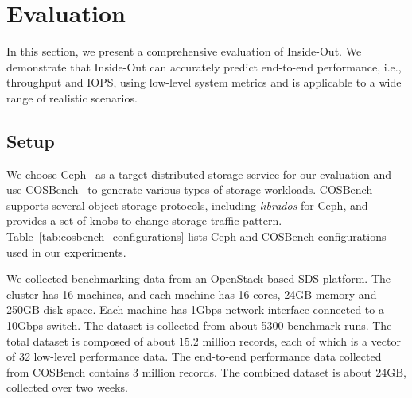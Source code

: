 
\section{Evaluation}
\label{sec:evaluation}

In this section, we present a comprehensive evaluation of Inside-Out.
We demonstrate that Inside-Out can accurately predict end-to-end performance, 
i.e., throughput and IOPS, using low-level system metrics and
is applicable to a wide range of realistic scenarios.



\subsection{Setup}
\label{sec:dataset}

We choose Ceph~\cite{ceph} as a target distributed storage service for our evaluation and             
use COSBench~\cite{cosbench} to generate various types of storage workloads.
COSBench supports several object storage protocols, including \textit{librados} for Ceph, and
provides a set of knobs to change storage traffic pattern. 
Table~\ref{tab:cosbench_configurations} lists Ceph and COSBench configurations used in our experiments.





We collected benchmarking data from an OpenStack-based SDS platform.
The cluster has 16 machines, and
each machine has 16 cores, 24GB memory and 250GB disk space.
Each machine has 1Gbps network interface connected to a 10Gbps switch.
The dataset is collected from about 5300 benchmark runs. The total dataset is composed of about 15.2 million records, each of which is 
a vector of 32 low-level performance data.
The end-to-end performance data collected from COSBench contains 
3 million records. 
The combined dataset is about 24GB, collected over two weeks. 

